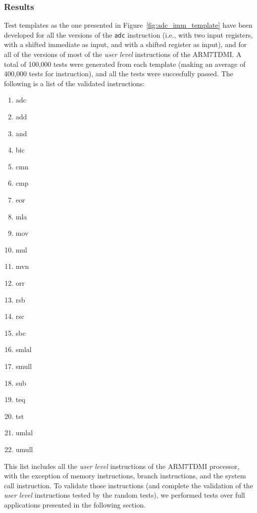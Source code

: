 \subsubsection{Results}

Test templates as the one presented in Figure~\ref{fig:adc_imm_template} have been developed for all the versions of the \texttt{adc} instruction (i.e., with two input registers, with a shifted immediate as input, and with a shifted register as input), and for all of the versions of most of the \emph{user level} instructions of the ARM7TDMI.
A total of 100,000 tests were generated from each template (making an average of 400,000 tests for instruction), and all the tests were succesfully passed. The following is a list of the validated instructions:
\begin{enumerate}
	\item adc
	\item add
	\item and
	\item bic
	\item cmn
	\item cmp
	\item eor
	\item mla
	\item mov
	\item mul
	\item mvn
	\item orr
	\item rsb
	\item rsc
	\item sbc
	\item smlal
	\item smull
	\item sub
	\item teq
	\item tst
	\item umlal
	\item umull
\end{enumerate}

This list includes all the \emph{user level} instructions of the ARM7TDMI processor, with the exception of memory instructions, branch instructions, and the system call instruction.
To validate those instructions (and complete the validation of the \emph{user level} instructions tested by the random tests), we performed tests over full applications presented in the following section.
